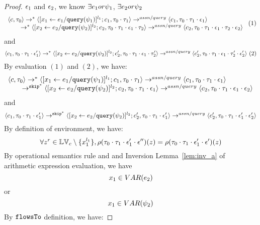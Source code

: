 \begin{proof}
 $\mathtt{\epsilon}_1$ and $\mathtt{\epsilon}_2$, we know $\exists e_1 or \psi_1$, $\exists e_2 or \psi_2$
 \[
  \begin{array}{l}   
\langle {c}, \mathtt{\tau}_0 \rangle \rightarrow^{*} 
\langle [\mathrel{ {x}_1 \leftarrow e_1 / {\tt query}(\psi_1) }]^{l_1} ; {c}_1, \mathtt{\tau}_0 \cdot \mathtt{\tau}_1 \rangle  
\rightarrow^{assn/query}
 \langle c_1, \mathtt{\tau}_0 \cdot \mathtt{\tau}_1 \cdot \mathtt{\epsilon}_1 \rangle \\
  \qquad \rightarrow^{*} 
  \langle [\mathrel{ {x}_2 \leftarrow e_2 / {\tt query}(\psi_2) }]^{l_2};{c}_2, 
  \mathtt{\tau}_0 \cdot \mathtt{\tau}_1 \cdot \mathtt{\epsilon}_1 \cdot \mathtt{\tau}_2 \rangle 
  \rightarrow^{assn/query} 
  \langle {c}_2,  \mathtt{\tau}_0 \cdot \mathtt{\tau}_1 \cdot \mathtt{\epsilon}_1 \cdot \mathtt{\tau}_2 \cdot \mathtt{\epsilon}_2 \rangle 
\end{array} ~ (1)
 \]
 and 
  \[
  \langle c_1, \mathtt{\tau}_0 \cdot \mathtt{\tau}_1 \cdot \mathtt{\epsilon}_1' \rangle 
  \rightarrow^{*} 
  \langle [\mathrel{ {x}_2 \leftarrow e_2 / {\tt query}(\psi_2) }]^{l_2} ; {c}_2', \mathtt{\tau}_0 \cdot \mathtt{\tau}_1 \cdot \mathtt{\epsilon}_1 \cdot \mathtt{\tau}_2' \rangle 
  \rightarrow^{assn/query} 
  \langle {c}_2',  \mathtt{\tau}_0 \cdot \mathtt{\tau}_1 \cdot \mathtt{\epsilon}_1 \cdot \mathtt{\tau}_2' \cdot \mathtt{\epsilon}_2' \rangle 
 ~(2)
 \]
%
 By evaluation $(1)$ and $(2)$, we have:
\[
  \begin{array}{l}   
\langle {c}, \mathtt{\tau}_0 \rangle \rightarrow^{*} 
\langle [\mathrel{ {x}_1 \leftarrow e_1 / {\tt query}(\psi_1) }]^{l_1} ; {c}_1, \mathtt{\tau}_0 \cdot \mathtt{\tau}_1 \rangle  \rightarrow^{assn/query}
 \langle c_1, \mathtt{\tau}_0 \cdot \mathtt{\tau}_1 \cdot \mathtt{\epsilon}_1 \rangle \\
  \qquad \rightarrow^{\mathtt{skip}^*} 
  \langle [\mathrel{ {x}_2 \leftarrow e_2 / {\tt query}(\psi_2) }]^{l_2};{c}_2, 
  \mathtt{\tau}_0 \cdot \mathtt{\tau}_1 \cdot \mathtt{\epsilon}_1 \rangle 
  \rightarrow^{assn/query} 
  \langle {c}_2,  \mathtt{\tau}_0 \cdot \mathtt{\tau}_1 \cdot \mathtt{\epsilon}_1 \cdot \mathtt{\epsilon}_2 \rangle 
\end{array}
 \]
 and 
  \[
  \langle c_1, \mathtt{\tau}_0 \cdot \mathtt{\tau}_1 \cdot \mathtt{\epsilon}_1' \rangle 
  \rightarrow^{\mathtt{skip}^*} 
  \langle [\mathrel{ {x}_2 \leftarrow e_2 / {\tt query}(\psi_2) }]^{l_2} ; {c}_2', \mathtt{\tau}_0 \cdot \mathtt{\tau}_1 \cdot \mathtt{\epsilon}_1' \rangle 
  \rightarrow^{assn/query} 
  \langle {c}_2',  \mathtt{\tau}_0 \cdot \mathtt{\tau}_1 \cdot \mathtt{\epsilon}_1' \cdot \mathtt{\epsilon}_2' \rangle 
 \]
%
By definition of environment, we have:
\[
  \forall z^r \in \mathbb{LV}_c \setminus \{x_1^{l_1}\} ,
  \rho(\mathtt{\tau}_0 \cdot \mathtt{\tau}_1 \cdot \mathtt{\epsilon}_1' \cdot \mathtt{\epsilon}'') (z) =  
  \rho(\mathtt{\tau}_0 \cdot \mathtt{\tau}_1 \cdot \mathtt{\epsilon}_1' \cdot \mathtt{\epsilon}') (z)
\]
%
By operational semantics rule  and  and {Inversion Lemma~\ref{lem:inv_a}} of arithmetic expression evaluation, we have 
\[
  x_1 \in VAR(e_2)
\]
or
\[
  x_1 \in VAR(\psi_2)
\]
%
By $\mathtt{flowsTo}$ definition, we have:

\end{proof}
